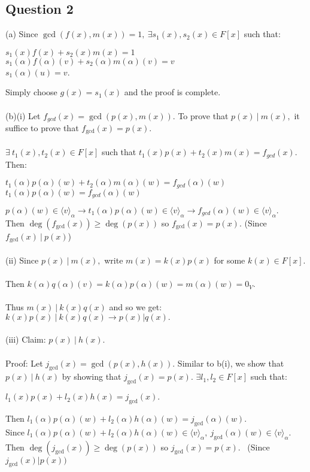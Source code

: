 \documentclass{article}
\begin{document}
\subsection*{Question 2}
(a) Since $\gcd(f(x),m(x)) = 1,\ \exists s_1(x), s_2(x) \in F[x]$ such that:\begin{center}
    $s_1(x)f(x) + s_2(x)m(x) = 1$\\
    $s_1(\alpha)f(\alpha)(v) + s_2(\alpha) m(\alpha)(v) = v$\\
    $s_1(\alpha)(u)=v$.
\end{center}
Simply choose $g(x) = s_1(x)$ and the proof is complete.\\\\
(b)(i)
Let $f_{gcd}(x) = \gcd(p(x),m(x)).$ To prove that $p(x)\ |\ m(x),$ it suffice to prove that $f_{\gcd}(x)=p(x).$\\\\
 $\exists\ t_1(x), t_2(x) \in F[x]$ such that $t_1(x)p(x) + t_2(x)m(x) = f_{gcd}(x)$. Then:\begin{center}
     $t_1(\alpha)p(\alpha)(w) + t_2(\alpha)m(\alpha)(w) = f_{gcd}(\alpha)(w)$ \\$
     t_1(\alpha)p(\alpha)(w) = f_{gcd}(\alpha)(w)$
 \end{center}
 $p(\alpha)(w) \in \langle v \rangle_\alpha\to t_1(\alpha)p(\alpha)(w) \in \langle v \rangle_\alpha \to  f_{gcd}(\alpha)(w)\in \langle v \rangle_\alpha.$\\ Then $\deg(f_{\gcd}(x)) \geq \deg(p(x))$ so $f_{\gcd}(x) = p(x).$ (Since $f_{\gcd}(x)\ |\ p(x)$)\\\\
 (ii) Since $p(x)\ |\ m(x),$ write $m(x) = k(x)p(x)$ for some $k(x) \in F[x]$.\\\\
 Then $k(\alpha)q(\alpha)(v) = k(\alpha)p(\alpha)(w) = m(\alpha)(w) = 0_V.$ \\\\ Thus $m(x)\ |\ k(x)q(x)$ and so we get: $k(x)p(x)\ |\ k(x)q(x) \to p(x)|q(x).$\\\\
 (iii) Claim: $p(x)\ |\ h(x).$\\\\
 Proof: Let $j_{\gcd}(x) = \gcd(p(x),h(x)).$ Similar to b(i), we show that $p(x)\ |\ h(x)$ by showing that $j_{\gcd}(x) = p(x).$
 $\exists l_1, l_2 \in F[x]$ such that:\begin{center}
     $l_1(x)p(x) + l_2(x)h(x) = j_{\gcd}(x).$
 \end{center}
 Then $l_1(\alpha)p(\alpha)(w) + l_2(\alpha)h(\alpha)(w) = j_{\gcd}(\alpha)(w).$\\Since $l_1(\alpha)p(\alpha)(w) + l_2(\alpha)h(\alpha)(w) \in \langle v \rangle_\alpha,\ j_{\gcd}(\alpha)(w) \in \langle v \rangle_\alpha$.\\Then $\deg(j_{\gcd}(x))\geq \deg(p(x)) $ so $j_{\gcd}(x) = p(x).$ \ (Since $j_{\gcd}(x)|p(x))$\\\\
\end{document}
